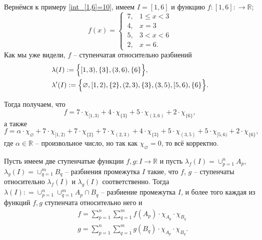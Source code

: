 \begin{example}

Вернёмся к примеру \ref{int_[1,6]=10}, имеем $I = [1,6]$ и функцию $f: [1,6]: \to \mathbb{R}$;
    \[
     f(x) = \begin{cases}
         \,7, & 1 \le x < 3 \\
         \,4, & x = 3 \\
         \,5, & 3 < x <6 \\
         \,2, & x = 6.
     \end{cases}
    \]
Как мы уже видели, $f$ -- ступенчатая относительно разбиений
\begin{align*}
    &  \lambda(I) := \Bigl\{[1,3), \{3\}, (3,6), \{6\} \Bigr\},\\
    &  \lambda'(I) : = \Bigl\{\varnothing, [1,2), \{2\}, (2,3), \{3\}, (3,5), [5,6),\{6\} \Bigr\}.
\end{align*}

Тогда получаем, что
\[
 f = 7 \cdot \chi_{[1,3)} + 4 \cdot \chi_{\{3\}} + 5 \cdot \chi_{(3,6)} + 2 \cdot \chi_{\{6\}},  
\]
а также
\[
f = \alpha \cdot \chi_{\varnothing} + 7 \cdot \chi_{[1,2)} + 7 \cdot \chi_{\{2\}} + 7 \cdot \chi_{(2,3)} + 4 \cdot \chi_{\{3\}} + 5 \cdot \chi_{(3,5)} + 5 \cdot \chi_{[5,6)} + 2 \cdot \chi_{\{6\}},
\]
где $\alpha \in \mathbb{R}$ -- произвольное число, но так как $\chi_\varnothing = 0$, то всё корректно.
\end{example}

\begin{proposition}\label{beautefull}
    Пусть имеем две ступенчатые функции $f,g:I \to \mathbb{R}$ и пусть $\lambda_f(I) = \cup_{p=1}^n A_p$, $\lambda_g(I) = \cup_{q=1}^m B_q$ -- разбиения промежутка $I$ такие, что $f$, $g$ -- ступенчаты относительно $\lambda_f(I)$ и $\lambda_g(I)$ соответственно. Тогда $\lambda(I): = \cup_{p=1}^n \cup_{q=1}^m A_p \cap B_q$ -- разбиение промежутка $I$, и более того каждая из функций $f,g$ ступенчата относительно него и
    \begin{align*}
        & f =  \sum_{p=1}^n\sum_{q=1}^m f(A_p) \cdot \chi_{A_p}\cdot \chi_{B_q}\\
        & g=  \sum_{p=1}^n\sum_{q=1}^m g(B_q) \cdot \chi_{A_p} \cdot \chi_{B_q}.
    \end{align*}
\end{proposition}

